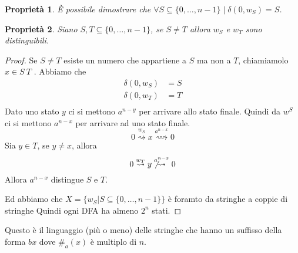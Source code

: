 \documentclass[12pt]{report}
\newtheorem{proprietà}{Proprietà}
\begin{document}
	\begin{proprietà}
	\`E possibile dimostrare che $\forall S \subseteq \{0, \dots, n - 1\} \mid \delta(0, w_S) = S$. 
	\end{proprietà}
	\begin{proprietà}
	Siano $S, T \subseteq \{0, \dots, n - 1\}$, se $S \neq T$ allora $w_S$ e $w_T$ sono distinguibili. 
	\end{proprietà}
	\begin{proof}	%
		Se $S \neq T$ esiste un numero che appartiene a $S$ ma non a $T$, chiamiamolo $x \in S \ T$ .
		Abbiamo che
		\begin{align*}
			\delta(0, w_S) &= S \\
			\delta(0, w_T) &= T \\
		\end{align*}
		Dato uno stato $y$ ci si mettono $a^{n - y}$ per arrivare allo stato finale.
		Quindi da $w^S$ ci si mettono $a^{n - x}$ per arrivare ad uno stato finale.
		$$ 0 \overset{w_S}{\rightsquigarrow} x \overset{a^{n - x}}{\rightsquigarrow} 0 $$
		Sia $y \in T$, se $y \neq x$, allora
		$$ 0 \overset{w_T}{\rightsquigarrow} y \not \overset{a^{n - x}}{\rightsquigarrow} 0 $$
		Allora $a^{n - x}$ distingue $S$ e $T$.

		Ed abbiamo che $X = \{ w_S | S \subseteq \{0, \dots, n - 1 \} \}$ è foramto da stringhe a coppie di stringhe %
		Quindi ogni DFA ha almeno $2^n$ stati.
	\end{proof}
	Questo è il linguaggio (più o meno) delle stringhe che hanno un suffisso della forma $bx$ dove $\#_a(x)$ è multiplo di $n$.
\end{document}
